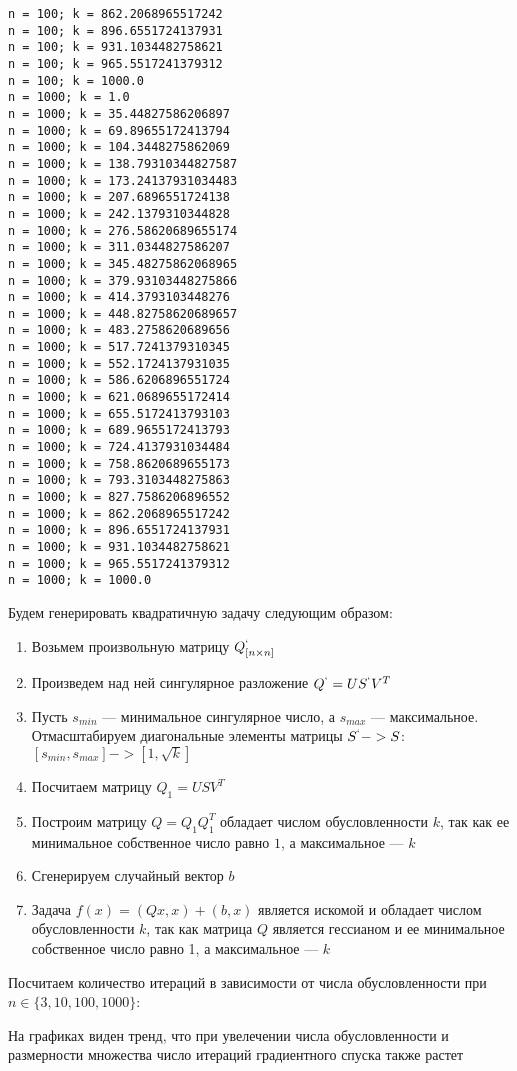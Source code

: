 \documentclass{article}
\providecommand{\tightlist}{%
      \setlength{\itemsep}{0pt}\setlength{\parskip}{0pt}}
\begin{document}
\begin{Verbatim}[commandchars=\\\{\}]
n = 100; k = 862.2068965517242
n = 100; k = 896.6551724137931
n = 100; k = 931.1034482758621
n = 100; k = 965.5517241379312
n = 100; k = 1000.0
n = 1000; k = 1.0
n = 1000; k = 35.44827586206897
n = 1000; k = 69.89655172413794
n = 1000; k = 104.3448275862069
n = 1000; k = 138.79310344827587
n = 1000; k = 173.24137931034483
n = 1000; k = 207.6896551724138
n = 1000; k = 242.1379310344828
n = 1000; k = 276.58620689655174
n = 1000; k = 311.0344827586207
n = 1000; k = 345.48275862068965
n = 1000; k = 379.93103448275866
n = 1000; k = 414.3793103448276
n = 1000; k = 448.82758620689657
n = 1000; k = 483.2758620689656
n = 1000; k = 517.7241379310345
n = 1000; k = 552.1724137931035
n = 1000; k = 586.6206896551724
n = 1000; k = 621.0689655172414
n = 1000; k = 655.5172413793103
n = 1000; k = 689.9655172413793
n = 1000; k = 724.4137931034484
n = 1000; k = 758.8620689655173
n = 1000; k = 793.3103448275863
n = 1000; k = 827.7586206896552
n = 1000; k = 862.2068965517242
n = 1000; k = 896.6551724137931
n = 1000; k = 931.1034482758621
n = 1000; k = 965.5517241379312
n = 1000; k = 1000.0
    \end{Verbatim}

    Будем генерировать квадратичную задачу следующим образом:

\begin{enumerate}
\def\labelenumi{\arabic{enumi}.}
\tightlist
\item
  Возьмем произвольную матрицу \(Q^`_{[n \times n]}\)
\item
  Произведем над ней сингулярное разложение \(Q^` = U S^` V^T\)
\item
  Пусть \(s_{min}\) --- минимальное сингулярное число, а \(s_{max}\) ---
  максимальное. Отмасштабируем диагональные элементы матрицы
  \(S^` -> S\): \([s_{min}, s_{max}] -> [1, \sqrt{k}]\)
\item
  Посчитаем матрицу \(Q_{1} = U S V^T\)
\item
  Построим матрицу \(Q = Q_1Q_1^T\) обладает числом обусловленности
  \(k\), так как ее минимальное собственное число равно \(1\), а
  максимальное --- \(k\)
\item
  Сгенерируем случайный вектор \(b\)
\item
  Задача \(f(x) = (Qx, x) + (b, x)\) является искомой и обладает числом
  обусловленности \(k\), так как матрица \(Q\) является гессианом и ее
  минимальное собственное число равно 1, а максимальное --- \(k\)
\end{enumerate}

Посчитаем количество итераций в зависимости от числа обусловленности при
\(n \in \{3, 10, 100, 1000\}\):

    На графиках виден тренд, что при увелечении числа обусловленности и
размерности множества число итераций градиентного спуска также растет


    
    
    
\end{document}

